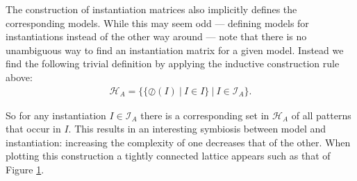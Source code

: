 \documentclass{llncs}
\begin{document}
The construction of instantiation matrices also implicitly defines the corresponding models. While this may seem odd --- defining models for instantiations instead of the other way around --- note that there is no unambiguous way to find an instantiation matrix for a given model. Instead we find the following trivial definition by applying the inductive construction rule above:
%
\begin{align}
\mathcal{H}_A=\big\{\{\oslash({I}) \ | \ {I} \in {I} \} \ \big | \ {I} \in \mathcal{I}_A \big\}.
\end{align}

So for any instantiation ${I}\in \mathcal{I}_A$ there is a corresponding set in $\mathcal{H}_A$ of all patterns that occur in ${I}$. This results in an interesting symbiosis between model and instantiation: increasing the complexity of one decreases that of the other. When plotting this construction a tightly connected lattice appears such as that of Figure \ref{lattice}. 

\begin{figure}

\label{lattice}
\end{figure}


\end{document}
